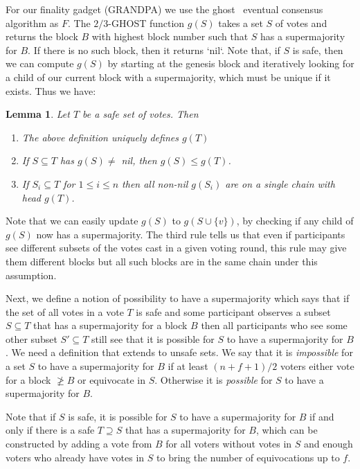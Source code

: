 \documentclass{article}
\newtheorem{lemma}[theorem]{Lemma}
\begin{document}
For our finality gadget (GRANDPA) we use the ghost~\cite{lewenberg15inclusive} eventual consensus algorithm as $F$.
The $2/3$-GHOST function $g(S)$ takes a set $S$ of votes and returns the block $B$ with highest block number such that $S$ has a supermajority for $B$.
If there is no such block, then it returns `nil`. 
Note that, if $S$ is safe, then we can compute $g(S)$ by starting at the genesis block and iteratively looking for a child of our current block with a supermajority, which must be unique if it exists. Thus we have:
\begin{lemma} \label{lem:ghost-monotonicity}
Let $T$ be a safe set of votes. Then
\begin{enumerate}
\item The above definition uniquely defines $g(T)$
\item If $S \subseteq T$ has $g(S) \neq$ nil, then $g(S) \leq g(T)$.
\item If $S_i \subseteq T$ for $1 \leq i \leq n$ then all non-nil $g(S_i)$ are on a single chain with head $g(T)$.
\end{enumerate}

\end{lemma}

Note that we can easily update $g(S)$ to $g(S \cup \{v\})$, by checking if any child of $g(S)$ now has a supermajority.
The third rule tells us that even if participants see different subsets of the votes cast in a given voting round, this rule may give them different blocks but all such blocks are in the same chain under this assumption. 

Next, we define a notion of possibility to have a supermajority which says that if the set of all votes in a vote $T$ is safe and some participant observes a subset $S \subseteq T$ that has a supermajority for a block $B$ then all participants who see some other subset $S' \subseteq T$ still see that it is possible for $S$ to have a supermajority for $B$. We need a definition that extends to unsafe sets.
We say that it is {\em impossible} for a set $S$ to have a supermajority for $B$ if at least $(n+f+1)/2$ voters either vote for a block $\not \geq B$ or equivocate in $S$. Otherwise it is {\em possible} for $S$ to have a supermajority for $B$.

Note that if $S$ is safe, it is possible for $S$ to have a supermajority for $B$ if and only if there is a safe $T \supseteq S$ that has a supermajority for $B$, which can be constructed by adding a vote from $B$ for all voters without votes in $S$ and enough voters who already have votes in $S$ to bring the number of equivocations up to $f$.
\end{document}
